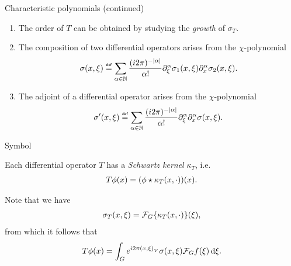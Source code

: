 \documentclass[handout]{beamer}
\begin{document}
\begin{frame}
    {Characteristic polynomials (continued)}

    \begin{enumerate}
        \item
            The order of $T$ can be obtained by studying the \emph{growth} of $\sigma_T$.
            \pause
        \item
            The composition of two differential operators arises from the $\chi$-polynomial
            \begin{align}
                \sigma(x, \xi)
                \defeq
                \sum_{\alpha \in \N}
                \frac {(i \turn)^{-\abs \alpha}} {\alpha!}
                \iD {\xi^\alpha} \sigma_1(x, \xi)
                \iD {x^\alpha} \sigma_2(x, \xi).
                \label{eq:Euclidean_composition_formula}
            \end{align}
            \pause
        \item
            The adjoint of a differential operator arises from the $\chi$-polynomial
            \begin{align}
                \sigma'(x, \xi)
                \defeq
                \sum_{\alpha \in \N}
                \frac {(i \turn)^{-\abs \alpha}} {\alpha!}
                \iD {\xi^\alpha}
                \iD {x^\alpha} \sigma(x, \xi).
                \label{eq:Euclidean_adjunction_formula}
            \end{align}
    \end{enumerate}
\end{frame}

\begin{frame}
    {Symbol}

    Each differential operator $T$ has a \emph{Schwartz kernel} $\kappa_T$, i.e.\
    \begin{align*}
        T \phi(x) = (\phi \star \kappa_T(x, \cdot))(x).
    \end{align*}

    \pause
    Note that we have
    \begin{align*}
        \sigma_T(x, \xi)
        = \mathcal{F}_{G} \{\kappa_T(x, \cdot)\}(\xi),
    \end{align*}
    \pause
    from which it follows that
    \begin{align*}
        T \phi(x) =
        \int_{G} e^{i 2 \pi {\left(x, \xi\right)_{V}}} \sigma(x, \xi) \mathcal{F}_{G} f(\xi) \,\mathrm{d} \xi.
    \end{align*}
\end{frame}
\end{document}
